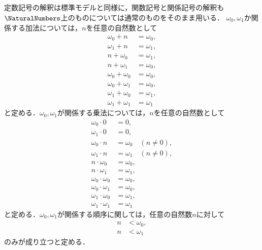 \subsection*{}

定数記号の解釈は標準モデルと同様に，関数記号と関係記号の解釈も\(\NaturalNumbers\)上のものについては通常のものをそのまま用いる．
\(\omega_0, \omega_1\)か関係する加法については，\(n\)を任意の自然数として
\begin{align*}
	\omega_0 + n        & = \omega_0, \\
	\omega_1 + n        & = \omega_1, \\
	n + \omega_0        & = \omega_1, \\
	n + \omega_1        & = \omega_0, \\
	\omega_0 + \omega_0 & = \omega_0, \\
	\omega_0 + \omega_1 & = \omega_0, \\
	\omega_1 + \omega_0 & = \omega_1, \\
	\omega_1 + \omega_1 & = \omega_1
\end{align*}
と定める．\(\omega_0, \omega_1\)が関係する乗法については，\(n\)を任意の自然数として
\begin{align*}
	\omega_0 \cdot 0        & = 0,                         \\
	\omega_1 \cdot 0        & = 0,                         \\
	\omega_0 \cdot n        & = \omega_0 \quad (n \neq 0), \\
	\omega_1 \cdot n        & = \omega_1 \quad (n \neq 0), \\
	n \cdot \omega_0        & = \omega_0,                  \\
	n \cdot \omega_1        & = \omega_1,                  \\
	\omega_0 \cdot \omega_0 & = \omega_0,                  \\
	\omega_0 \cdot \omega_1 & = \omega_0,                  \\
	\omega_1 \cdot \omega_0 & = \omega_1,                  \\
	\omega_1 \cdot \omega_1 & = \omega_1
\end{align*}
と定める．\(\omega_0, \omega_1\)が関係する順序に関しては，任意の自然数\(n\)に対して
\begin{align*}
	n & < \omega_0, \\
	n & < \omega_1
\end{align*}
のみが成り立つと定める．

